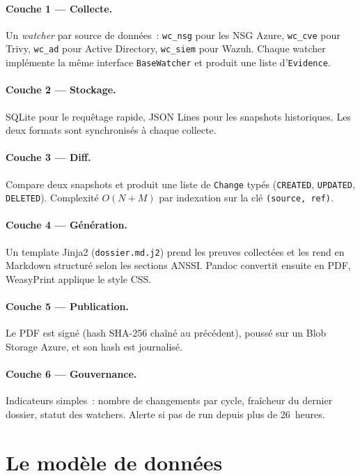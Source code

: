\paragraph{Couche 1 --- Collecte.}
Un \emph{watcher} par source de données~: \texttt{wc\_nsg} pour
les NSG Azure, \texttt{wc\_cve} pour Trivy, \texttt{wc\_ad} pour
Active Directory, \texttt{wc\_siem} pour Wazuh. Chaque watcher
implémente la même interface \texttt{BaseWatcher} et produit une
liste d'\texttt{Evidence}.

\paragraph{Couche 2 --- Stockage.}
SQLite pour le requêtage rapide, JSON Lines pour les snapshots
historiques. Les deux formats sont synchronisés à chaque
collecte.

\paragraph{Couche 3 --- Diff.}
Compare deux snapshots et produit une liste de \texttt{Change}
typés (\texttt{CREATED}, \texttt{UPDATED}, \texttt{DELETED}).
Complexité $O(N+M)$ par indexation sur la clé
\texttt{(source, ref)}.

\paragraph{Couche 4 --- Génération.}
Un template Jinja2 (\texttt{dossier.md.j2}) prend les preuves
collectées et les rend en Markdown structuré selon les sections
ANSSI. Pandoc convertit ensuite en PDF, WeasyPrint applique le
style CSS.

\paragraph{Couche 5 --- Publication.}
Le PDF est signé (hash SHA-256 chaîné au précédent), poussé sur
un Blob Storage Azure, et son hash est journalisé.

\paragraph{Couche 6 --- Gouvernance.}
Indicateurs simples~: nombre de changements par cycle, fraîcheur
du dernier dossier, statut des watchers. Alerte si pas de run
depuis plus de 26~heures.

\section{Le modèle de données}


